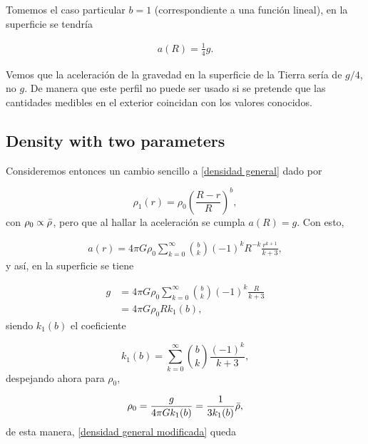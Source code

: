 \documentclass[aps,twocolumn,showpacs,preprintnumbers]{revtex4}
\begin{document}
    Tomemos el caso particular $b=1$ (correspondiente a una función lineal), en la superficie se tendría 
    
    \begin{align*}
        a(R) = \frac{1}{4}g.
    \end{align*}
    
    Vemos que la aceleración de la gravedad en la superficie de la Tierra sería de $g/4$, no $g$. De manera que este perfil no puede ser usado si se pretende que las cantidades medibles en el exterior coincidan con los valores conocidos.
    
    \subsection{Density with two parameters}
    
    Consideremos entonces un cambio sencillo a \eqref{densidad general} dado por
    
     \begin{equation}
        \rho_1(r) = \rho_0 \left( \frac{R-r}{R}\right)^b,
        \label{densidad general modificada}
    \end{equation}
    con $\rho_0 \propto \Bar{\rho}$, pero que al hallar la aceleración se cumpla $a(R) = g$. Con esto, 
    
     \begin{align*}
          a (r) %
          =  4 \pi G \rho_0  \sum_{k=0}^{\infty} \binom{b}{k} (-1)^k R^{-k}  \frac{r^{k+1}}{k+3}, 
    \end{align*}
    y así, en la superficie se tiene
    
    \begin{align*}
        g &= 4 \pi G \rho_0  \sum_{k=0}^{\infty} \binom{b}{k} (-1)^k  \frac{R}{k+3} \\ 
        &= 4 \pi G \rho_0 R k_1(b),
    \end{align*}
    siendo $k_1(b)$ el coeficiente 
    
    \begin{equation*}
        k_1(b) =  \sum_{k=0}^{\infty} \binom{b}{k}  \frac{(-1)^k }{k+3} ,
    \end{equation*}
    despejando ahora para $\rho_0$,
    
    \begin{align*}
        \rho_0 = \frac{g}{4\pi G k_1(b)} %
        = \frac{1}{3k_1(b)} \Bar{\rho},
    \end{align*}
    de esta manera, \eqref{densidad general modificada} queda
    
\end{document}
